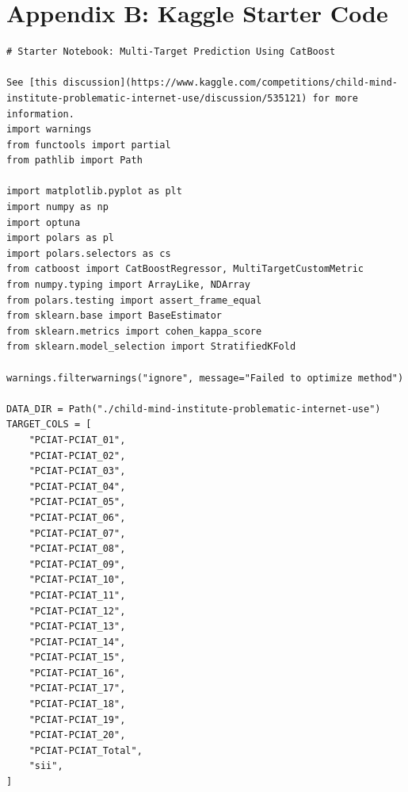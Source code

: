 \documentclass[11pt]{extarticle}
\begin{document}
\section*{Appendix B: Kaggle Starter Code}
\begin{mdframed}
\begin{lstlisting}[breaklines=true]
# Starter Notebook: Multi-Target Prediction Using CatBoost

See [this discussion](https://www.kaggle.com/competitions/child-mind-institute-problematic-internet-use/discussion/535121) for more information.
import warnings
from functools import partial
from pathlib import Path

import matplotlib.pyplot as plt
import numpy as np
import optuna
import polars as pl
import polars.selectors as cs
from catboost import CatBoostRegressor, MultiTargetCustomMetric
from numpy.typing import ArrayLike, NDArray
from polars.testing import assert_frame_equal
from sklearn.base import BaseEstimator
from sklearn.metrics import cohen_kappa_score
from sklearn.model_selection import StratifiedKFold

warnings.filterwarnings("ignore", message="Failed to optimize method")

DATA_DIR = Path("./child-mind-institute-problematic-internet-use")
TARGET_COLS = [
    "PCIAT-PCIAT_01",
    "PCIAT-PCIAT_02",
    "PCIAT-PCIAT_03",
    "PCIAT-PCIAT_04",
    "PCIAT-PCIAT_05",
    "PCIAT-PCIAT_06",
    "PCIAT-PCIAT_07",
    "PCIAT-PCIAT_08",
    "PCIAT-PCIAT_09",
    "PCIAT-PCIAT_10",
    "PCIAT-PCIAT_11",
    "PCIAT-PCIAT_12",
    "PCIAT-PCIAT_13",
    "PCIAT-PCIAT_14",
    "PCIAT-PCIAT_15",
    "PCIAT-PCIAT_16",
    "PCIAT-PCIAT_17",
    "PCIAT-PCIAT_18",
    "PCIAT-PCIAT_19",
    "PCIAT-PCIAT_20",
    "PCIAT-PCIAT_Total",
    "sii",
]


\end{lstlisting}
\end{mdframed}
\end{document}
